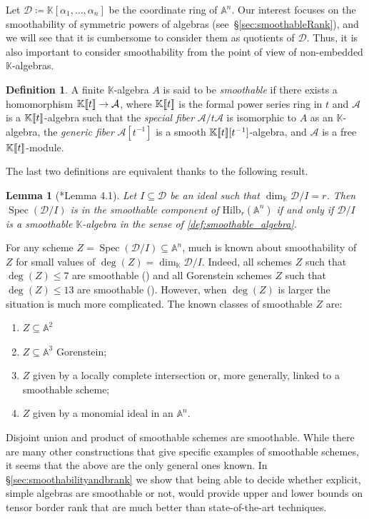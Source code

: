 \documentclass[a4paper,11pt,reqno]{amsart}
\newcommand{\calA}{\mathcal{A}}
\newcommand{\calD}{\mathcal{D}}
\newcommand{\bbA}{\mathbb{A}}
\newcommand{\bbK}{\mathbb{K}}
\DeclareMathOperator{\Spec}{Spec}
\newcommand{\Hilb}{\mathrm{Hilb}}
\numberwithin{equation}{section}
\theoremstyle{definition}
\newtheorem{defn}[equation]{Definition}
\theoremstyle{plain}
\newtheorem{lem}[defn]{Lemma}
\theoremstyle{remark}
\begin{document}
Let $\calD \coloneq \bbK[\alpha_{1},\dots,\alpha_{n}]$ be the coordinate ring
of $\mathbb{A}^n$.
Our interest focuses on the smoothability of symmetric powers of
algebras (see~\S\ref{sec:smoothableRank}), and we will see that it is cumbersome to consider them as
quotients of $\calD$. Thus, it is also important to consider smoothability
from the point of view of non-embedded $\bbK$-algebras.
\begin{defn}
\label{def:smoothable_algebra}
A {finite} $\bbK$-algebra $A$ is said to be \textit{smoothable} if there
exists a homomorphism $\powerseries\to \calA$, where $\powerseries$ is the
formal power series ring in $t$ and $\calA$ is a $\powerseries$-algebra
such that the \emph{special fiber} $\calA/t\calA$ is isomorphic to $A$ as an
$\bbK$-algebra,
the \emph{generic fiber} $\calA[t^{-1}]$ is a smooth
$\powerseries[t^{-1}]$-algebra, and $\calA$ is a free $\powerseries$-module.
\end{defn}
The last two definitions are equivalent thanks to the following result.
\begin{lem}[\cite{CEVV09}*{Lemma 4.1}]
\label{lem:equivalence_smoothability}
Let $I\subseteq\calD$ be an ideal such that $\dim_{\bbK} \calD/I =
r$. Then
$\Spec(\calD/I)$ is in the
smoothable component of $\Hilb_r(\bbA^n)$ if and only if $\calD/I$ is a smoothable
$\bbK$-algebra in the sense of \autoref{def:smoothable_algebra}.
\end{lem}
For any scheme $Z = \Spec(\calD/I)\subseteq\bbA^n$, much is known about smoothability of $Z$ for small values of
$\deg(Z) = \dim_{\bbK} \calD/I$. Indeed, all schemes $Z$ such that $\deg(Z)\leq 7$ are
smoothable (\cite{CEVV09}) and all Gorenstein schemes $Z$ such that $\deg(Z)\leq 13$ are
smoothable (\cite{CJN13}). However, when $\deg(Z)$ is larger the situation is
much more complicated. The known classes
of smoothable $Z$ are:
\begin{enumerate}[label=(\arabic*), left= 3pt, widest=2,nosep]
    \item $Z \subseteq \mathbb{A}^2$
    \item $Z \subseteq \mathbb{A}^3$ Gorenstein;
    \item $Z$ given by a locally complete intersection or, more generally,
        linked to a smoothable scheme;
    \item $Z$ given by a monomial ideal in an $\mathbb{A}^n$.
\end{enumerate}
Disjoint union and product of smoothable schemes are smoothable. While there
are many other constructions that give specific examples of smoothable
schemes, it seems that the above are the only general ones known. In
\S\ref{sec:smoothabilityandbrank}
 we show that being able to decide {whether} explicit, simple algebras are smoothable or not, would provide upper and lower bounds on tensor border rank that are much better than state-of-the-art techniques.
\end{document}
